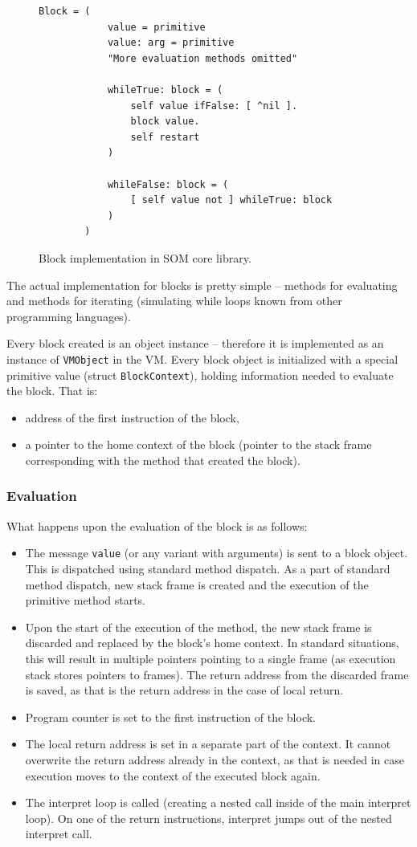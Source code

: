 \documentclass[thesis=M,english]{FITthesis}[2019/12/23]
\begin{document}
\begin{figure}[h!]
	\centering
	\begin{lstlisting}[language=Smalltalk]
		Block = (
			value = primitive
			value: arg = primitive
			"More evaluation methods omitted"
			
			whileTrue: block = (
				self value ifFalse: [ ^nil ].
				block value.
				self restart
			)

			whileFalse: block = (
				[ self value not ] whileTrue: block
			)
		)
	\end{lstlisting}
	\caption{Block implementation in SOM core library.}
\end{figure}

The actual implementation for blocks is pretty simple -- methods for evaluating and methods for iterating (simulating while loops known from
other programming languages).

Every block created is an object instance -- therefore it is implemented as an instance of \texttt{VMObject} in the VM. Every block object is
initialized with a special primitive value (struct \texttt{BlockContext}), holding information needed to evaluate the block. That is:
\begin{itemize}
	\item address of the first instruction of the block,
	\item a pointer to the home context of the block (pointer to the stack frame corresponding with the method that created the block).
\end{itemize}

\subsubsection{Evaluation}
What happens upon the evaluation of the block is as follows:
\begin{itemize}
	\item The message \texttt{value} (or any variant with arguments) is sent to a block object. This is dispatched using standard method
		dispatch. As a part of standard method dispatch, new stack frame is created and the execution of the primitive method starts.
	\item Upon the start of the execution of the method, the new stack frame is discarded and replaced by the block's home context. In
		standard situations, this will result in multiple pointers pointing to a single frame (as execution stack stores pointers to frames).
		The return address from the discarded frame is saved, as that is the return address in the case of local return.
	\item Program counter is set to the first instruction of the block.
	\item The local return address is set in a separate part of the context. It cannot overwrite the return address already in the context,
		as that is needed in case execution moves to the context of the executed block again.
	\item The interpret loop is called (creating a nested call inside of the main interpret loop). On one of the return instructions, 
		interpret jumps out of the nested interpret call. 
\end{itemize}
\end{document}
